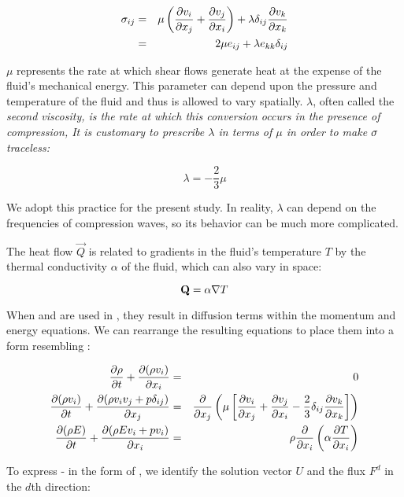 \begin{eqnarray}
\sigma_{ij} &=& \mu\left(\frac{\partial v_i}{\partial x_j} + \frac{\partial v_j}{\partial x_i}\right) + \lambda \delta_{ij} \frac{\partial v_k}{\partial x_k} \notag \\
         &=& 2\mu e_{ij} + \lambda e_{kk} \delta_{ij} \label{eq:viscTensor}
\end{eqnarray}

\noindent
$\mu$ represents the rate at which shear flows generate heat at the expense of 
the fluid's mechanical energy. This parameter can depend upon the pressure 
and temperature of the fluid and thus is allowed to vary spatially. $\lambda$,
often called the \em second viscosity\em, is the rate at which this conversion 
occurs in the presence of compression, It is customary to prescribe 
$\lambda$ in terms of $\mu$ in order to make $\mathbf{\sigma}$ traceless:

\begin{equation}
\lambda = -\frac{2}{3}\mu \label{eq:lambda}
\end{equation}

\noindent
We adopt this practice for the present study. In reality, $\lambda$ can depend 
on the frequencies of compression waves, so its behavior can be much more 
complicated\cite{Landau1959}.

The heat flow $\vec{Q}$ is related to gradients in the fluid's temperature $T$ 
by the thermal conductivity $\alpha$ of the fluid, which can also vary in space:

\begin{equation}
\mathbf{Q} = \alpha \nabla{T} \label{eq:heatFlow}
\end{equation}

When  and  are used in , they 
result in diffusion terms within the momentum and energy equations. 
We can rearrange the resulting equations to place them into a form resembling 
:

\begin{eqnarray}
\frac{\partial \rho}{\partial t} + \frac{\partial (\rho v_i)}{\partial x_i} &=& 0 \label{eq:continuity} \\
\frac{\partial (\rho v_i)}{\partial t} + \frac{\partial (\rho v_i v_j + p\delta_{ij})}{\partial x_j} &=& 
   \frac{\partial }{\partial x_j}\left(\mu\left[\frac{\partial v_i}{\partial x_j} + \frac{\partial v_j}{\partial x_i} - \frac{2}{3}\delta_{ij}\frac{\partial v_k}{\partial x_k}\right]\right) \label{eq:momentum} \\
\frac{\partial (\rho E)}{\partial t} + \frac{\partial (\rho E v_i + p v_i)}{\partial x_i} &=& \rho\frac{\partial }{\partial x_i}\left(\alpha\frac{\partial T}{\partial x_i}\right) \label{eq:energy} 
\end{eqnarray}

\noindent
To express  -  in the form of 
, we identify the solution vector $U$ and the flux 
$F^d$ in the $d$th direction:

